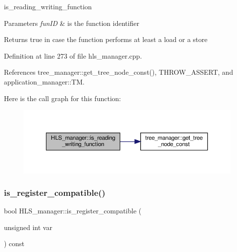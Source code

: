 is\+\_\+reading\+\_\+writing\+\_\+function 


\begin{DoxyParams}{Parameters}
{\em fun\+ID} & is the function identifier \\
\hline
\end{DoxyParams}
\begin{DoxyReturn}{Returns}
true in case the function performs at least a load or a store 
\end{DoxyReturn}


Definition at line 273 of file hls\+\_\+manager.\+cpp.



References tree\+\_\+manager\+::get\+\_\+tree\+\_\+node\+\_\+const(), T\+H\+R\+O\+W\+\_\+\+A\+S\+S\+E\+RT, and application\+\_\+manager\+::\+TM.

Here is the call graph for this function\+:
\nopagebreak
\begin{figure}[H]
\begin{center}
\leavevmode
\includegraphics[width=350pt]{dc/dd7/classHLS__manager_a2f8e9a8fb92f0d197f5b5e0eee2821bc_cgraph}
\end{center}
\end{figure}
\mbox{\label{classHLS__manager_afb452aef787733de4a11d00cc4e1f36a}} 
\subsubsection{\texorpdfstring{is\+\_\+register\+\_\+compatible()}{is\_register\_compatible()}}
{\footnotesize\ttfamily bool H\+L\+S\+\_\+manager\+::is\+\_\+register\+\_\+compatible (\begin{DoxyParamCaption}\item[{unsigned int}]{var }\end{DoxyParamCaption}) const}




